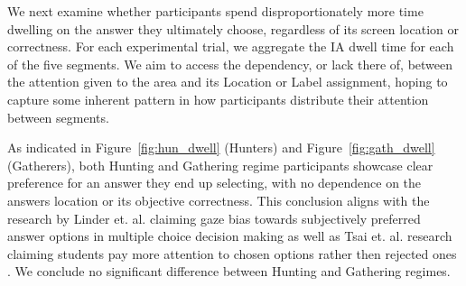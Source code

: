 \documentclass{article}
\begin{document}
    We next examine whether participants spend disproportionately more time dwelling on the answer they ultimately choose, regardless of its screen location or correctness. For each experimental trial, we aggregate the IA dwell time for each of the five segments. We aim to access the dependency, or lack there of, between the attention given to the area and its Location or Label assignment, hoping to capture some inherent pattern in how participants distribute their attention between segments. 
 
    As indicated in Figure~\ref{fig:hun_dwell} (Hunters) and Figure~\ref{fig:gath_dwell} (Gatherers), both Hunting and Gathering regime participants showcase clear preference for an answer they end up selecting, with no dependence on the answers location or its objective correctness. This conclusion aligns with the research by Linder et. al. claiming gaze bias towards subjectively preferred answer options in multiple choice decision making \parencite{lindner2014tracking} as well as Tsai et. al. research claiming students pay more attention to chosen options rather then rejected ones \parencite{tsai2012visual}. We conclude no significant difference between Hunting and Gathering regimes.
\end{document}
